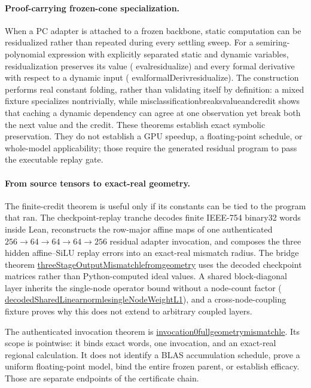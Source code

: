 \documentclass[11pt]{article}
\newcommand{\leanname}[1]{{\scriptsize\ttfamily
  \def\_{\textunderscore\allowbreak}#1}}
\newcommand{\leancommit}{f3a31db36bb2f944312ee31c1d86c2758109e83a}
\newcommand{\leansource}[3]{%
  \href{https://github.com/zariuq/MeTTapedia/blob/\leancommit/#1\#L#2}{\leanname{#3}}}
\begin{document}
\paragraph{Proof-carrying frozen-cone specialization.}
When a PC adapter is attached to a frozen backbone, static computation can be
residualized rather than repeated during every settling sweep. For a semiring-polynomial
expression with explicitly separated static and dynamic variables, residualization
preserves its value
(\leanname{eval\_residualize})
and every formal derivative with respect to a dynamic input
(\leanname{eval\_formalDeriv\_residualize}).
The construction performs real constant folding, rather than validating itself by
definition: a mixed fixture specializes nontrivially, while
\leanname{misclassification\_breaks\_value\_and\_credit}
shows that caching a dynamic dependency can agree at one observation yet break both the
next value and the credit. These theorems establish exact symbolic preservation. They do
not establish a GPU speedup, a floating-point schedule, or whole-model applicability;
those require the generated residual program to pass the executable replay gate.

\paragraph{From source tensors to exact-real geometry.}
The finite-credit theorem is useful only if its constants can be tied to the program that
ran. The checkpoint-replay tranche decodes finite IEEE-754 binary32 words inside Lean,
reconstructs the row-major affine maps of one authenticated
$256\!\to\!64\!\to\!64\!\to\!64\!\to\!256$ residual adapter invocation, and composes
the three hidden affine--SiLU replay errors into an exact-real mismatch radius. The
bridge theorem
\leansource{lean/mettapedia/Mettapedia/MachineLearning/NeuralNetworks/CreditTransport/Float32ReplayGeometryBridge.lean}{206}{threeStageOutputMismatch\_le\_from\_geometry}
uses the decoded checkpoint matrices rather than Python-computed ideal values. A shared
block-diagonal layer inherits the single-node operator bound without a node-count factor
(\leansource{lean/mettapedia/Mettapedia/MachineLearning/NeuralNetworks/CreditTransport/Float32CheckpointGeometry.lean}{390}{decodedSharedLinear\_norm\_le\_singleNodeWeightL1}),
and a cross-node-coupling fixture proves why this does not extend to arbitrary coupled
layers.

The authenticated invocation theorem is
\leansource{lean/mettapedia/artifacts/generated_lean_fixtures/CreditTransport/Float32AffineLayerOperatorNorms.lean}{197}{invocation0\_full\_geometry\_mismatch\_le}.
Its scope is pointwise: it binds exact words, one invocation, and an exact-real regional
calculation. It does not identify a BLAS accumulation schedule, prove a uniform
floating-point model, bind the entire frozen parent, or establish efficacy. Those are
separate endpoints of the certificate chain.
\end{document}

